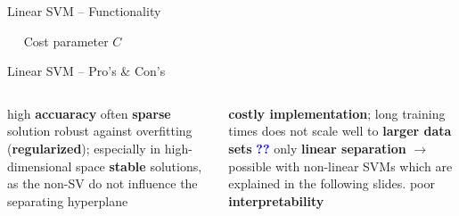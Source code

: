\begin{vbframe}{Linear SVM -- Functionality}
\medskip

 ~~ Cost parameter \textbf{$C$}


\end{vbframe}


\begin{frame}{Linear SVM -- Pro's \& Con's}

\footnotesize


\begin{columns}[onlytextwidth]
  \begin{column}{0.5\textwidth}
    \footnotesize
    \begin{itemize}
      \positem high \textbf{accuaracy}
      \positem often \textbf{sparse} solution
      \positem robust against overfitting (\textbf{regularized}); especially in high-dimensional space
      \positem \textbf{stable} solutions, as the non-SV do not influence the separating hyperplane
    \end{itemize}
  \end{column}

  \begin{column}{0.5\textwidth}
    \footnotesize
    \begin{itemize}
      \negitem \textbf{costly implementation}; long training times
      \negitem does not scale well to \textbf{larger data sets} \textcolor{blue}{\textbf{??}}
      \negitem only \textbf{linear separation} $\rightarrow$ possible with non-linear SVMs which are explained in the following slides.
      \negitem poor \textbf{interpretability}
    \end{itemize}
  \end{column}
\end{columns}

\vfill

\small


\end{frame}

